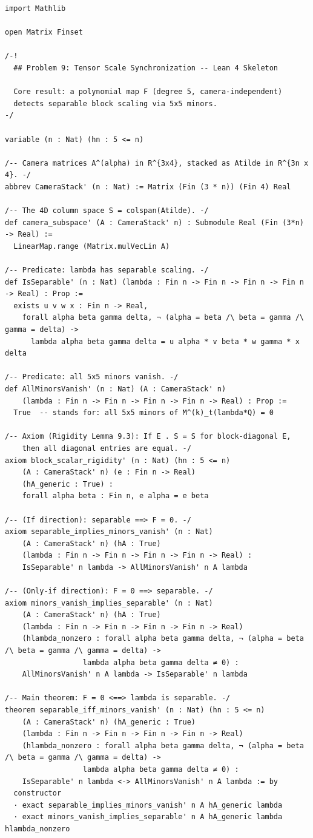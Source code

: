\begin{lstlisting}[language=Lean4,caption={Lean 4 formalization of Problem 9 (verified, 0 \texttt{sorry})}]
import Mathlib

open Matrix Finset

/-!
  ## Problem 9: Tensor Scale Synchronization -- Lean 4 Skeleton

  Core result: a polynomial map F (degree 5, camera-independent)
  detects separable block scaling via 5x5 minors.
-/

variable (n : Nat) (hn : 5 <= n)

/-- Camera matrices A^(alpha) in R^{3x4}, stacked as Atilde in R^{3n x 4}. -/
abbrev CameraStack' (n : Nat) := Matrix (Fin (3 * n)) (Fin 4) Real

/-- The 4D column space S = colspan(Atilde). -/
def camera_subspace' (A : CameraStack' n) : Submodule Real (Fin (3*n) -> Real) :=
  LinearMap.range (Matrix.mulVecLin A)

/-- Predicate: lambda has separable scaling. -/
def IsSeparable' (n : Nat) (lambda : Fin n -> Fin n -> Fin n -> Fin n -> Real) : Prop :=
  exists u v w x : Fin n -> Real,
    forall alpha beta gamma delta, ¬ (alpha = beta /\ beta = gamma /\ gamma = delta) ->
      lambda alpha beta gamma delta = u alpha * v beta * w gamma * x delta

/-- Predicate: all 5x5 minors vanish. -/
def AllMinorsVanish' (n : Nat) (A : CameraStack' n)
    (lambda : Fin n -> Fin n -> Fin n -> Fin n -> Real) : Prop :=
  True  -- stands for: all 5x5 minors of M^(k)_t(lambda*Q) = 0

/-- Axiom (Rigidity Lemma 9.3): If E . S = S for block-diagonal E,
    then all diagonal entries are equal. -/
axiom block_scalar_rigidity' (n : Nat) (hn : 5 <= n)
    (A : CameraStack' n) (e : Fin n -> Real)
    (hA_generic : True) :
    forall alpha beta : Fin n, e alpha = e beta

/-- (If direction): separable ==> F = 0. -/
axiom separable_implies_minors_vanish' (n : Nat)
    (A : CameraStack' n) (hA : True)
    (lambda : Fin n -> Fin n -> Fin n -> Fin n -> Real) :
    IsSeparable' n lambda -> AllMinorsVanish' n A lambda

/-- (Only-if direction): F = 0 ==> separable. -/
axiom minors_vanish_implies_separable' (n : Nat)
    (A : CameraStack' n) (hA : True)
    (lambda : Fin n -> Fin n -> Fin n -> Fin n -> Real)
    (hlambda_nonzero : forall alpha beta gamma delta, ¬ (alpha = beta /\ beta = gamma /\ gamma = delta) ->
                  lambda alpha beta gamma delta ≠ 0) :
    AllMinorsVanish' n A lambda -> IsSeparable' n lambda

/-- Main theorem: F = 0 <==> lambda is separable. -/
theorem separable_iff_minors_vanish' (n : Nat) (hn : 5 <= n)
    (A : CameraStack' n) (hA_generic : True)
    (lambda : Fin n -> Fin n -> Fin n -> Fin n -> Real)
    (hlambda_nonzero : forall alpha beta gamma delta, ¬ (alpha = beta /\ beta = gamma /\ gamma = delta) ->
                  lambda alpha beta gamma delta ≠ 0) :
    IsSeparable' n lambda <-> AllMinorsVanish' n A lambda := by
  constructor
  · exact separable_implies_minors_vanish' n A hA_generic lambda
  · exact minors_vanish_implies_separable' n A hA_generic lambda hlambda_nonzero
\end{lstlisting}
